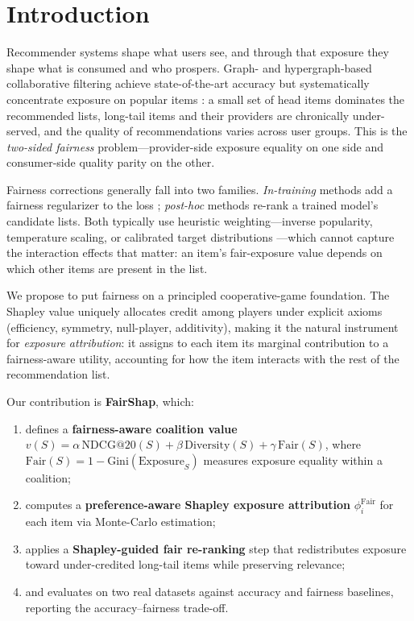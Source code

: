 \documentclass[pdflatex,sn-mathphys-num]{sn-jnl}%
\makeatletter
\theoremstyle{thmstyleone}%
\theoremstyle{thmstyletwo}%
\theoremstyle{thmstylethree}%
\newcommand{\fair}{\mathrm{Fair}}
\newcommand{\NDCG}{\mathrm{NDCG@20}}
\newcommand{\Gini}{\mathrm{Gini}}
\makeatother
\begin{document}
\section{Introduction}\label{sec1}

Recommender systems shape what users see, and through that exposure they shape what is consumed and who prospers. Graph- and hypergraph-based collaborative filtering achieve state-of-the-art accuracy but systematically concentrate exposure on popular items \cite{abdollahpouri2019popularity}: a small set of head items dominates the recommended lists, long-tail items and their providers are chronically under-served, and the quality of recommendations varies across user groups. This is the \emph{two-sided fairness} problem---provider-side exposure equality on one side and consumer-side quality parity on the other.

Fairness corrections generally fall into two families. \emph{In-training} methods add a fairness regularizer to the loss \cite{ghorbani2019datashapley}; \emph{post-hoc} methods re-rank a trained model's candidate lists. Both typically use heuristic weighting---inverse popularity, temperature scaling, or calibrated target distributions \cite{steck2018calibrated}---which cannot capture the interaction effects that matter: an item's fair-exposure value depends on which other items are present in the list.

We propose to put fairness on a principled cooperative-game foundation. The Shapley value \cite{shapley1953} uniquely allocates credit among players under explicit axioms (efficiency, symmetry, null-player, additivity), making it the natural instrument for \emph{exposure attribution}: it assigns to each item its marginal contribution to a fairness-aware utility, accounting for how the item interacts with the rest of the recommendation list.

Our contribution is \textbf{FairShap}, which:
\begin{enumerate}
\item defines a \textbf{fairness-aware coalition value} $v(S)=\alpha\,\NDCG{}(S)+\beta\,\mathrm{Diversity}(S)+\gamma\,\fair(S)$, where $\fair(S)=1-\Gini(\mathrm{Exposure}_S)$ measures exposure equality within a coalition;
\item computes a \textbf{preference-aware Shapley exposure attribution} $\phi_i^{\fair}$ for each item via Monte-Carlo estimation;
\item applies a \textbf{Shapley-guided fair re-ranking} step that redistributes exposure toward under-credited long-tail items while preserving relevance;
\item and evaluates on two real datasets against accuracy and fairness baselines, reporting the accuracy--fairness trade-off.
\end{enumerate}
\end{document}
